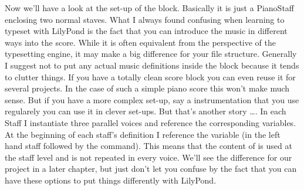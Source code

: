 \documentclass[../LilyPond-Tutorials]{subfiles}
\begin{document}
Now we'll have a look at the set-up of the  block. 
Basically it is just a PianoStaff enclosing two normal staves. 
What I always found confusing when learning to typeset with LilyPond is the fact that you can introduce the music in different ways into the score. 
While it is often equivalent from the perspective of the typesetting engine, it may make a big difference for your file structure. 
Generally I suggest not to put any actual music definitions inside the  block because it tends to clutter things. 
If you have a totally clean score block you can even reuse it for several projects. 
In the case of such a simple piano score this won't make much sense. 
But if you have a more complex set-up, say a instrumentation that you use regularely you can use it in clever set-ups. 
But that's another story \dots.
In each Staff I instantiate three parallel voices and reference the corresponding variables. 
At the beginning of each staff's definition I reference the  variable (in the left hand staff followed by the  command). 
This means that the content of  is used at the staff level and is not repeated in every voice. 
We'll see the difference for our project in a later chapter, but just don't let you confuse by the fact that you can have these options to put things differently with LilyPond.
\end{document}
